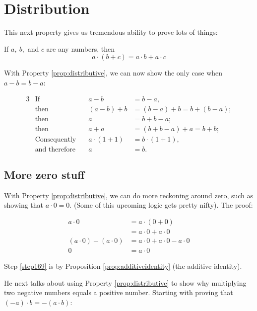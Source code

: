 \section{Distribution}

This next property gives us tremendous ability to prove lots of things:

\begin{property}\label{prop:distributive}
    If $a,~b,$ and $c$ are any numbers, then 
    $$
    a \cdot (b + c) = a \cdot b + a \cdot c
    $$
\end{property}


With Property \ref{prop:distributive}, we can now show the only case when $a - b = b-a$:

\begin{alignat*}{3}
    &\text{If}\quad& a - b &= b - a, \\
    & \text{then}\quad& (a-b) + b &= (b-a) + b = b + (b-a);\\
    & \text{then}\quad& a &= b + b -a;\\
    & \text{then}\quad& a + a &= (b+b-a)+a = b+b;\\
    & \text{Consequently}\quad& a \cdot(1+1)&= b \cdot (1+1),\\
    &\text{and therefore}\quad& a &=b.
\end{alignat*}

\subsection{More zero stuff}

With Property \ref{prop:distributive}, we can do more reckoning around zero, such as
showing that $a \cdot 0 = 0$. (Some of this upcoming logic gets pretty nifty). The proof:

\begin{align}
    a \cdot 0 &= a \cdot (0+0) \label{step169} \\
              &= a\cdot0 + a \cdot 0\\
    (a\cdot 0) - (a \cdot 0) &= a \cdot 0 + a \cdot 0 - a \cdot 0\\
    0 &= a \cdot 0
\end{align}

Step \ref{step169} is by Proposition \ref{prop:additiveidentity} (the additive identity).

He next talks about using Property \ref{prop:distributive} to show why multiplying two
negative numbers equals a positive number. Starting with proving that $(-a) \cdot b = -(a
\cdot b)$:


